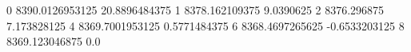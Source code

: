 0 8390.0126953125 20.8896484375
1 8378.162109375 9.0390625
2 8376.296875 7.173828125
4 8369.7001953125 0.5771484375
6 8368.4697265625 -0.6533203125
8 8369.123046875 0.0

